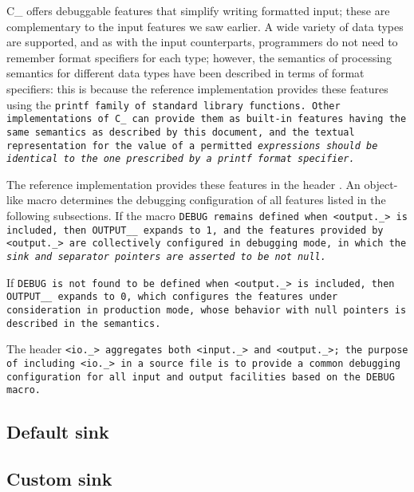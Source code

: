 \def\Subsection#1{\subsection{#1}}

C\_ offers debuggable features that simplify writing formatted input;
these are complementary to the input features we saw earlier.
A wide variety of data types are supported, and as with the input counterparts,
programmers do not need to remember format specifiers for each type; however, the
semantics of processing semantics for different data types have been described in
terms of format specifiers: this is because the reference implementation provides
these features using the \tt{printf} family of standard library functions.
Other implementations of C\_ can provide them as built-in
features having the same semantics as described by this document,
and the textual representation for the value of a permitted \it{expressions}
should be identical to the one prescribed by a \tt{printf} format specifier.

The reference implementation provides these features in the header .
An object-like macro  determines the debugging
configuration of all features listed in the following subsections.
If the macro \tt{DEBUG} remains defined when \tt{<output._>} is included,
then \tt{OUTPUT__} expands to \tt{1}, and the features provided
by \tt{<output._>} are collectively configured in debugging mode,
in which the \it{sink} and \it{separator} pointers are asserted to be not null.

If \tt{DEBUG} is not found to be defined when \tt{<output._>} is included, then
\tt{OUTPUT__} expands to \tt{0}, which configures the features under consideration
in production mode, whose behavior with null pointers is described in the semantics.

The header \tt{<io._>} aggregates both \tt{<input._>} and \tt{<output._>}; the
purpose of including \tt{<io._>} in a source file is to provide a common debugging
configuration for all input and output facilities based on the \tt{DEBUG} macro.

\Subsection{Default sink}

\Subsection{Custom  sink}
